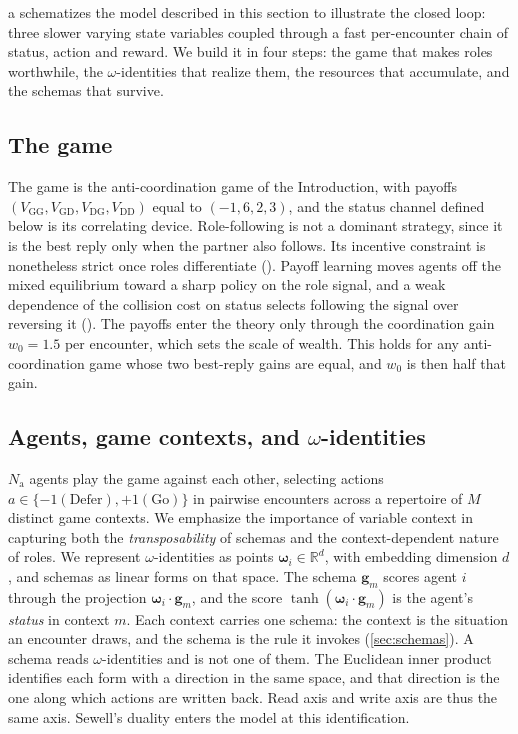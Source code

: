 \documentclass[
  aps,prx,
  reprint,
  superscriptaddress,
  nofootinbib,
  longbibliography
]{revtex4-2}
\newcommand{\w}{\bm{\omega}}
\newcommand{\g}{\mathbf{g}}
\newcommand{\Nag}{N_{\mathrm{a}}}
\newcommand{\smref}[1]{\cite[Sec.~#1]{SM}}
\begin{document}
\noindent {}a schematizes the model described in this section to illustrate the closed loop: three slower varying state variables coupled through a fast per-encounter chain of status, action and reward. We build it in four steps: the game that makes roles worthwhile, the $\omega$-identities that realize them, the resources that accumulate, and the schemas that survive.

\subsection{The game}
\noindent The game is the anti-coordination game of the Introduction, with payoffs $(V_{\mathrm{GG}},V_{\mathrm{GD}},V_{\mathrm{DG}},V_{\mathrm{DD}})$ equal to $(-1,6,2,3)$, and the status channel defined below is its correlating device. Role-following is not a dominant strategy, since it is the best reply only when the partner also follows. Its incentive constraint is nonetheless strict once roles differentiate (\smref{S1\,C}). Payoff learning moves agents off the mixed equilibrium toward a sharp policy on the role signal, and a weak dependence of the collision cost on status selects following the signal over reversing it (\smref{S1\,D}). The payoffs enter the theory only through the coordination gain $w_0=1.5$ per encounter, which sets the scale of wealth. This holds for any anti-coordination game whose two best-reply gains are equal, and $w_0$ is then half that gain.

\subsection{Agents, game contexts, and $\omega$-identities}
\noindent $\Nag$ agents play the game against each other, selecting actions $a\in\{-1 (\mathrm{Defer}),+1 (\mathrm{Go})\}$ in pairwise encounters across a repertoire of $M$ distinct game contexts. We emphasize the importance of variable context in capturing both the \emph{transposability} of schemas and the context-dependent nature of roles. We represent $\omega$-identities as points $\w_i\in\mathbb{R}^d$, with embedding dimension $d$, and schemas as linear forms on that space. The schema $\g_m$ scores agent $i$ through the projection $\w_i\cdot\g_m$, and the score $\tanh(\w_i\cdot\g_m)$ is the agent's \emph{status} in context $m$. Each context carries one schema: the context is the situation an encounter draws, and the schema is the rule it invokes (\cref{sec:schemas}). A schema reads $\omega$-identities and is not one of them. The Euclidean inner product identifies each form with a direction in the same space, and that direction is the one along which actions are written back. Read axis and write axis are thus the same axis. Sewell's duality enters the model at this identification.
\end{document}
